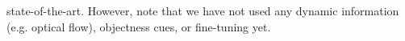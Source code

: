 \documentclass[10pt,twocolumn,letterpaper]{article}
\begin{document}
state-of-the-art. However, note that we have not used any dynamic information (e.g. optical flow), objectness cues, or fine-tuning yet.  \label{sec:experiments}



\clearpage
\newpage{\small


}
\end{document}
